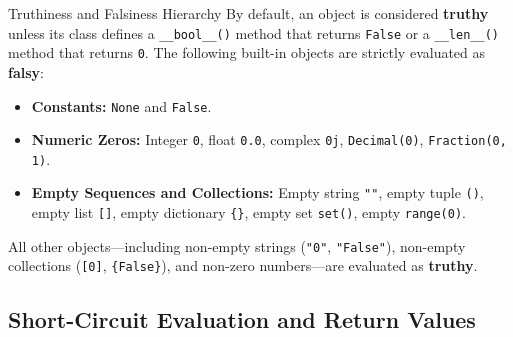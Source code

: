 \begin{theorembox}{Truthiness and Falsiness Hierarchy}
 
By default, an object is considered \textbf{truthy} unless its class defines a \texttt{\_\_bool\_\_()} method that returns \texttt{False} or a \texttt{\_\_len\_\_()} method that returns \texttt{0}.
The following built-in objects are strictly evaluated as \textbf{falsy}:
\begin{itemize}
    \item \textbf{Constants:} \texttt{None} and \texttt{False}.
    \item \textbf{Numeric Zeros:} Integer \texttt{0}, float \texttt{0.0}, complex \texttt{0j}, \texttt{Decimal(0)}, \texttt{Fraction(0, 1)}.
    \item \textbf{Empty Sequences and Collections:} Empty string \texttt{""}, empty tuple \texttt{()}, empty list \texttt{[]}, empty dictionary \texttt{\{\}}, empty set \texttt{set()}, empty \texttt{range(0)}.
\end{itemize}
All other objects---including non-empty strings (\texttt{"0"}, \texttt{"False"}), non-empty collections (\texttt{[0]}, \texttt{\{False\}}), and non-zero numbers---are evaluated as \textbf{truthy}.
\end{theorembox}

\subsection{Short-Circuit Evaluation and Return Values}

